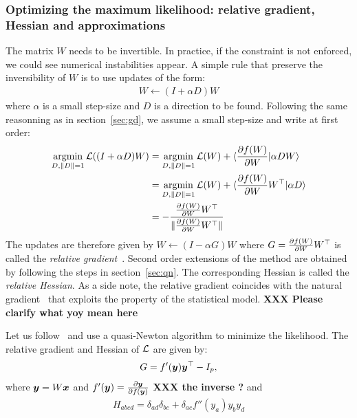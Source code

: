 \subsubsection{Optimizing the maximum likelihood: relative gradient, Hessian and approximations}
\label{sec:opt:likelihood:relativegradient}
The matrix $W$ needs to be invertible. In practice, if the constraint is not
enforced, we could see numerical instabilities appear.
A simple rule that preserve the inversibility of $W$ is to use updates of the
form:
\begin{align}
  W \leftarrow (I + \alpha D)W \label{eq:mult:update}
\end{align}
where $\alpha$ is a small step-size and $D$ is a direction to be found.
Following the same reasonning as in section~\ref{sec:gd}, we assume a small step-size
and write at first order:
\begin{align}
  \argmin_{D, \|D\|=1} \loss((I + \alpha D)W) &= \argmin_{D, \|D\|=1} \loss(W) + \langle \partialfrac{W}{f(W)} | \alpha D W \rangle \\
                                              &= \argmin_{D, \|D\|=1} \loss(W) + \langle \partialfrac{W}{f(W)} W^{\top} | \alpha D \rangle \\
                                              &= -\frac{\partialfrac{W}{f(W)} W^{\top}}{\|\partialfrac{W}{f(W)} W^{\top} \|}
\end{align}
The updates are therefore given by  $W \leftarrow (I - \alpha G)W$ where $G = \partialfrac{W}{f(W)}
  W^{\top}$ is called the \emph{relative
  gradient}~\cite{cardoso1996equivariant}.
Second order extensions of the method are obtained by following the steps in
section~\ref{sec:qn}. The corresponding Hessian is called the \emph{relative
  Hessian}.
As a side note, the relative gradient coincides with the natural
gradient~\cite{amari1999natural} that exploits the property of the statistical model. \textbf{XXX Please clarify what yoy mean here}


Let us follow~\cite{ablin2018faster} and use a quasi-Newton algorithm to minimize the likelihood.
The relative gradient and Hessian of $\loss$ are given by:
\begin{align}
  G = f'(\yb) \yb^{\top} - I_p,
\end{align}
where $\yb = W \xb$ and $f'(\yb) = \partialfrac{f(\yb)}{\yb}$ \textbf{XXX the inverse ?}
and
\begin{align}
  H_{abcd} =  \delta_{ad}\delta_{bc} + \delta_{ac} f''(y_a)y_by_d
\end{align}

